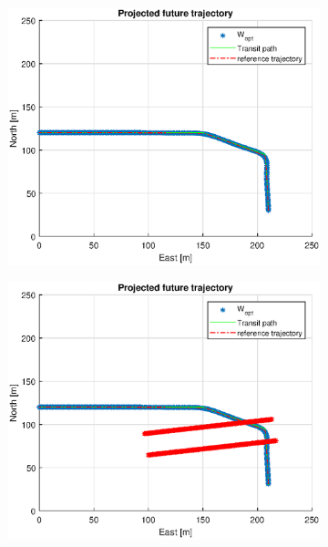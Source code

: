 \begin{figure} %
    \begin{subfigure}[b]{0.49\textwidth}
        \centering
        \includegraphics[width=\textwidth]{Images/Figures/Havn1/Simple1_f999_Frame1}
    \end{subfigure}
    \hfill
    \begin{subfigure}[b]{0.499\textwidth}
        \centering
        \includegraphics[width=\textwidth]{Images/Figures/Havn1/Simple1_f999_Frame2}

\end{subfigure}
\end{figure}
